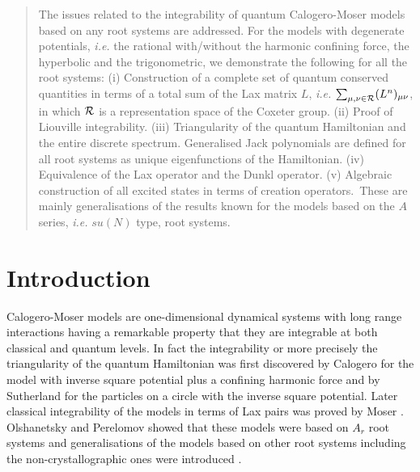 \documentclass[a4paper,12pt]{article}
\begin{document}
\begin{abstract}
The issues related to the integrability of quantum Calogero-Moser models
based on any root systems are addressed.
For the models with degenerate potentials, {\em i.e.}
the rational with/without the harmonic confining force,
the hyperbolic and the trigonometric,
we demonstrate the following for all the root systems:
(i) Construction of a complete set of quantum conserved quantities in terms
of a total sum of the Lax matrix \(L\), {\em i.e.}
\(\sum_{\mu,\nu\in{\cal R}}(L^n)_{\mu\nu}\), in which
\({\cal R}\) is a representation
space of the Coxeter group. (ii) Proof of Liouville integrability.
(iii) Triangularity of the quantum Hamiltonian and the entire
discrete spectrum. Generalised Jack polynomials are defined for all root
systems as unique eigenfunctions of the Hamiltonian. (iv) Equivalence of
the Lax operator and the Dunkl operator. (v) Algebraic construction of all
excited states in terms of creation operators.\  These are mainly
generalisations of the results known for the models based on the
\(A\) series, {\em i.e.} \(su(N)\) type, root systems.
\end{abstract}
\bigskip
\bigskip
\bigskip

\section{Introduction}
\label{intro}
\setcounter{equation}{0}



Calogero-Moser models are one-dimensional dynamical systems with long
range interactions having a remarkable property that they are integrable
at both classical and quantum levels.
In fact the integrability or more precisely the triangularity of
the quantum Hamiltonian was
first discovered by Calogero \cite{Cal} for the model with inverse square
potential plus a confining harmonic force and by Sutherland \cite{Sut}
for the particles on a circle with the inverse square potential.
Later classical integrability of the models in terms of Lax pairs
was proved by Moser \cite{CalMo}. Olshanetsky and Perelomov \cite{OP1}
showed that these models were based on \(A_r\) root systems and
generalisations of the models based on other root systems including the
non-crystallographic ones were introduced \cite{OP2}.
\end{document}
